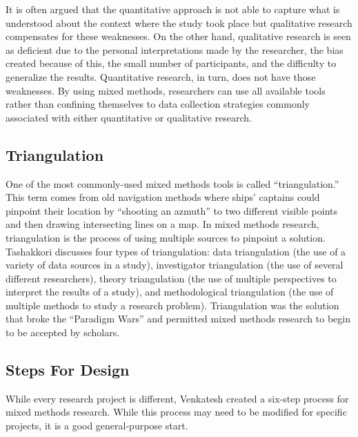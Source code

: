 It is often argued that the quantitative approach is not able to capture what is understood about the context where the study took place but qualitative research compensates for these weaknesses. On the other hand, qualitative research is seen as deficient due to the personal interpretations made by the researcher, the bias created because of this, the small number of participants, and the difficulty to generalize the results. Quantitative research, in turn, does not have those weaknesses. By using mixed methods, researchers can use all available tools rather  than confining themselves to data collection strategies commonly associated with either quantitative or qualitative research. 

\subsection{Triangulation}

One of the most commonly-used mixed methods tools is called ``triangulation.'' This term comes from old navigation methods where ships' captains could pinpoint their location by ``shooting an azmuth'' to two different visible points and then drawing intersecting lines on a map. In mixed methods research, triangulation is the process of using multiple sources to pinpoint a solution. Tashakkori\cite{tashakkori1998mixed} discusses four types of triangulation: data triangulation (the use of a variety of data sources in a study), investigator triangulation (the use of several different researchers), theory triangulation (the use of multiple perspectives to interpret the results of a study), and methodological triangulation (the use of multiple methods to study a research problem). Triangulation was the solution that broke the ``Paradigm Wars'' and permitted mixed methods research to begin to be accepted by scholars.

\subsection{Steps For Design}

While every research project is different, Venkatesh\cite{venkatesh2013bridging} created a six-step process for mixed methods research. While this process may need to be modified for specific projects, it is a good general-purpose start.

